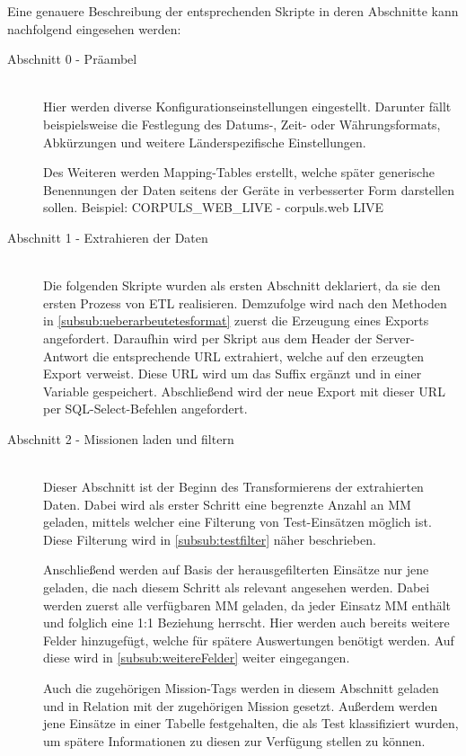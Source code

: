 Eine genauere Beschreibung der entsprechenden Skripte in deren Abschnitte kann nachfolgend eingesehen werden:
\begin{description}
\item[Abschnitt 0 - Präambel] \hfill \\
Hier werden diverse Konfigurationseinstellungen eingestellt.
Darunter fällt beispielsweise die Festlegung des Datums-, Zeit- oder Währungsformats, Abkürzungen und weitere Länderspezifische Einstellungen.

Des Weiteren werden Mapping-Tables erstellt, welche später generische Benennungen der Daten seitens der Geräte in verbesserter Form darstellen sollen. 
Beispiel: CORPULS\_WEB\_LIVE - corpuls.web LIVE

\item[Abschnitt 1 - Extrahieren der Daten]  \hfill \\
Die folgenden Skripte wurden als ersten Abschnitt deklariert, da sie den ersten Prozess von \gls{ETL} realisieren.
Demzufolge wird nach den Methoden in \ref{subsub:ueberarbeutetesformat} zuerst die Erzeugung eines Exports angefordert.
Daraufhin wird per Skript aus dem Header der Server-Antwort die entsprechende URL extrahiert, welche auf den erzeugten Export verweist.
Diese URL wird um das Suffix  ergänzt und in einer Variable gespeichert.
Abschließend wird der neue Export mit dieser URL per SQL-Select-Befehlen angefordert.

\item[Abschnitt 2 - Missionen laden und filtern] \hfill \\
Dieser Abschnitt ist der Beginn des Transformierens der extrahierten Daten.
Dabei wird als erster Schritt eine begrenzte Anzahl an \gls{MM} geladen, mittels welcher eine Filterung von Test-Einsätzen möglich ist.
Diese Filterung wird in \ref{subsub:testfilter} näher beschrieben.

Anschließend werden auf Basis der herausgefilterten Einsätze nur jene geladen, die nach diesem Schritt als relevant angesehen werden.
Dabei werden zuerst alle verfügbaren \gls{MM} geladen, da jeder Einsatz MM enthält und folglich eine 1:1 Beziehung herrscht.
Hier werden auch bereits weitere Felder hinzugefügt, welche für spätere Auswertungen benötigt werden.
Auf diese wird in \ref{subsub:weitereFelder} weiter eingegangen.

Auch die zugehörigen \glqq Mission-Tags\grqq{} werden in diesem Abschnitt geladen und in Relation mit der zugehörigen Mission gesetzt.
Außerdem werden jene Einsätze in einer Tabelle festgehalten, die als \glqq Test\grqq{} klassifiziert wurden, um spätere Informationen zu diesen zur Verfügung stellen zu können.


\end{description}
